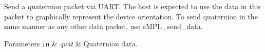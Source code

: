 Send a quaternion packet via U\+A\+R\+T. The host is expected to use the data in this packet to graphically represent the device orientation. To send quaternion in the same manner as any other data packet, use e\+M\+P\+L\+\_\+send\+\_\+data. 


\begin{DoxyParams}[1]{Parameters}
\mbox{\tt in}  & {\em quat} & Quaternion data. \\
\hline
\end{DoxyParams}
